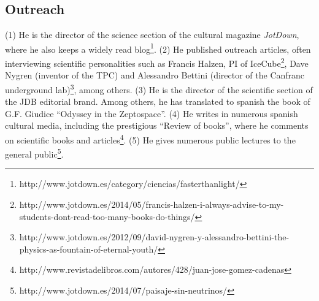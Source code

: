 \documentclass[a4paper,11pt,oneside]{article}
\begin{document}
\subsection{Outreach}
(1) He is the director of the science section of the cultural magazine {\em JotDown}, where he
also keeps a widely read blog\footnote{http://www.jotdown.es/category/ciencias/fasterthanlight/}.
(2) He published outreach articles, often interviewing scientific personalities such as Francis Halzen, PI of IceCube\footnote{http://www.jotdown.es/2014/05/francis-halzen-i-always-advise-to-my-students-dont-read-too-many-books-do-things/}, Dave Nygren (inventor of the TPC) and Alessandro Bettini (director of the Canfranc underground lab)\footnote{http://www.jotdown.es/2012/09/david-nygren-y-alessandro-bettini-the-physics-as-fountain-of-eternal-youth/}, among others. (3) He is the director of the scientific section of the JDB editorial brand. Among others, he has translated to spanish the book of G.F. Giudice ``Odyssey in the Zeptospace''. (4) He writes in numerous spanish cultural media, including the prestigious ``Review of books'', where he comments on scientific books and articles\footnote{http://www.revistadelibros.com/autores/428/juan-jose-gomez-cadenas}. (5) He gives numerous public lectures to the general public\footnote{
http://www.jotdown.es/2014/07/paisaje-sin-neutrinos/}.  
\end{document}
